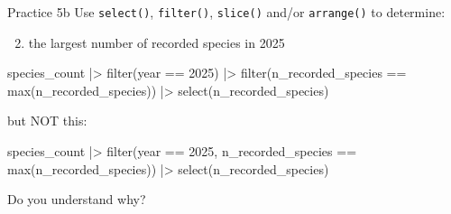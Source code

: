 \documentclass[
  ignorenonframetext,
  aspectratio=169,
  t]{beamer}
\newenvironment{Shaded}{\begin{snugshade}}{\end{snugshade}}
\newcommand{\DecValTok}[1]{\textcolor[rgb]{0.68,0.00,0.00}{#1}}
\newcommand{\FunctionTok}[1]{\textcolor[rgb]{0.28,0.35,0.67}{#1}}
\newcommand{\NormalTok}[1]{\textcolor[rgb]{0.00,0.23,0.31}{#1}}
\newcommand{\SpecialCharTok}[1]{\textcolor[rgb]{0.37,0.37,0.37}{#1}}
\providecommand{\tightlist}{%
  \setlength{\itemsep}{0pt}\setlength{\parskip}{0pt}}
\let\oldtexttt\texttt
\renewcommand{\texttt}[1]{\colorbox{gray!20}{\oldtexttt{#1}}}
\begin{document}
\begin{frame}[fragile]{Practice 5b}
\protect{}\label{practice-5b}
Use \texttt{select()}, \texttt{filter()}, \texttt{slice()} and/or
\texttt{arrange()} to determine:

\begin{enumerate}
\setcounter{enumi}{1}
\tightlist
\item
  the largest number of recorded species in 2025
\end{enumerate}

\footnotesize

\begin{Shaded}
\begin{Highlighting}[]
\NormalTok{species\_count }\SpecialCharTok{|\textgreater{}} 
    \FunctionTok{filter}\NormalTok{(year }\SpecialCharTok{==} \DecValTok{2025}\NormalTok{) }\SpecialCharTok{|\textgreater{}} 
    \FunctionTok{filter}\NormalTok{(n\_recorded\_species }\SpecialCharTok{==} \FunctionTok{max}\NormalTok{(n\_recorded\_species)) }\SpecialCharTok{|\textgreater{}} 
    \FunctionTok{select}\NormalTok{(n\_recorded\_species)}
\end{Highlighting}
\end{Shaded}

\normalsize

but NOT this:

\footnotesize

\begin{Shaded}
\begin{Highlighting}[]
\NormalTok{species\_count }\SpecialCharTok{|\textgreater{}} 
    \FunctionTok{filter}\NormalTok{(year }\SpecialCharTok{==} \DecValTok{2025}\NormalTok{, n\_recorded\_species }\SpecialCharTok{==} \FunctionTok{max}\NormalTok{(n\_recorded\_species)) }\SpecialCharTok{|\textgreater{}}
    \FunctionTok{select}\NormalTok{(n\_recorded\_species)}
\end{Highlighting}
\end{Shaded}

\normalsize

Do you understand why?
\end{frame}
\end{document}

